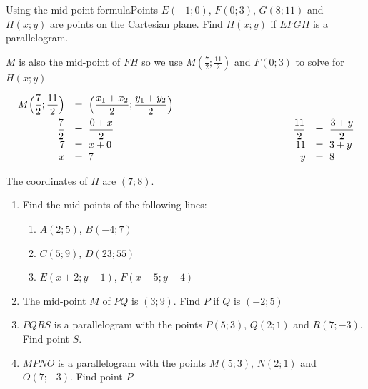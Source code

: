 \begin{wex}{Using the mid-point formula}{Points $E(-1;0)$, $F(0;3)$, $G(8;11)$ and $H(x;y)$ are points on the Cartesian plane. Find $H(x;y)$ if $EFGH$ is a parallelogram.}
{
$M$ is also the mid-point of $FH$ so we use 
$M(\frac{7}{2};\frac{11}{2})$ and $F(0;3)$ to solve for $H(x;y)$

\begin{equation*}
\begin{array}{rllrl}
 M\Big(\dfrac{7}{2};\dfrac{11}{2}\Big) &=~\Big(\dfrac{x_1+x_2}{2}; \dfrac{y_1+y_2}{2}\Big)\\[8pt]
\dfrac{7}{2}&=~\dfrac{0+x}{2}&\hskip10em&\dfrac{11}{2}&=~\dfrac{3+y}{2}\\
7&=~x+0&&11&=~3+y\\
x&=~7&&y&=~8\\
\end{array}
\end{equation*}

The coordinates of $H$ are $(7;8)$.
}
\end{wex}
\begin{exercises}{}{
\begin{enumerate}[itemsep=5pt, label=\textbf{\arabic*}. ]
\item Find the mid-points of the following lines:
  \begin{enumerate}[noitemsep, label=\textbf{(\alph*)} ]
\item $A(2;5)$, $B(-4;7)$
\item $C(5;9)$, $D(23;55)$
\item $E(x+2;y-1)$, $F(x-5;y-4)$
\end{enumerate}

\item The mid-point $M$ of $PQ$ is $(3;9)$. Find $P$ if $Q$ is $(-2;5)$
\item $PQRS$ is a parallelogram with the points $P(5;3)$, $Q(2;1)$ and $R(7;-3)$. Find point $S$.

\item $MPNO$ is a parallelogram with the points $M(5;3)$, $N(2;1)$ and $O(7;-3)$. Find point $P$.
\end{enumerate}
}
\end{exercises}    

